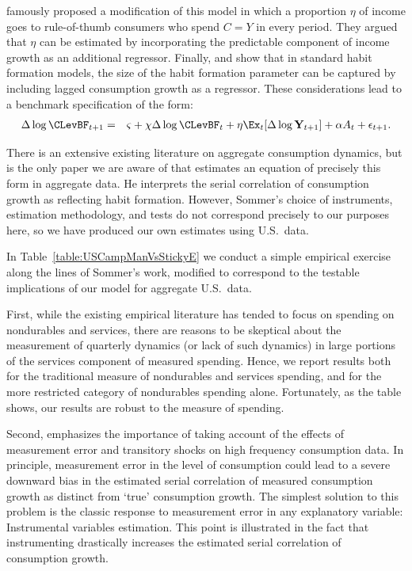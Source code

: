 \documentclass[titlepage]{\econtex}
\begin{document}
\cite{cmModel} famously proposed a modification of this model in which a proportion $\eta$ of income goes to rule-of-thumb consumers who spend $C=Y$ in every period.  They argued that $\eta$ can be estimated by incorporating the predictable component of income growth as an additional regressor.  Finally, \cite{dynanHabits} and \cite{som07} show that in standard habit formation models, the size of the habit formation parameter can be captured by including lagged consumption growth as a regressor.  These considerations lead to a benchmark specification of the form:
\begin{eqnarray}
  \label{eq:CGrowBench}
  \Delta \log \CLevBF_{t+1} & = & \varsigma+\chi \Delta \log \CLevBF_{t}+\eta \Ex_{t}[\Delta \log \mathbf{Y}_{t+1}]+\alpha A_{t}+\epsilon_{t+1}.
\end{eqnarray}

There is an extensive existing literature on aggregate consumption dynamics, but \cite{som07} is the only paper we are aware of that estimates an equation of precisely this form in aggregate data.  He interprets the serial correlation of consumption growth as reflecting habit formation. %
However, Sommer's choice of instruments, estimation methodology, and tests do not correspond precisely to our purposes here, so we have produced our own estimates using U.S.\ data.



In Table~\ref{table:USCampManVsStickyE} we conduct a simple empirical exercise along the lines of Sommer's work, modified to correspond to the testable implications of our model for aggregate U.S.\ data.

First, while the existing empirical literature has tended to focus on spending on nondurables and services, there are reasons to be skeptical about the measurement of quarterly dynamics (or lack of such dynamics) in large portions of the services component of measured spending.
Hence, we report results both for the traditional measure of nondurables and services spending, and for the more restricted category of nondurables spending alone.  Fortunately, as the table shows, our results are robust to the measure of spending. %

Second, \cite{som07} emphasizes the importance of taking account of the effects of measurement error and transitory shocks on high frequency consumption data.  In principle, measurement error in the level of consumption could lead to a severe downward bias in the estimated serial correlation of measured consumption growth as distinct from `true' consumption growth.  The simplest solution to this problem is the classic response to measurement error in any explanatory variable: Instrumental variables estimation.  This point is illustrated in the fact that instrumenting drastically increases the estimated serial correlation of consumption growth.
\end{document}
